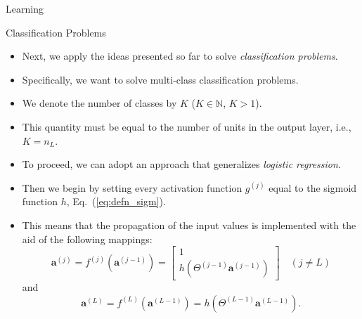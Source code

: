\documentclass[8pt,american]{beamer}
\begin{document}
\begin{frame}{Learning}

\begin{block}{Classification Problems}
\begin{itemize}
\justifying
\item Next, we apply the ideas presented so far to solve \textit{classification
  problems}.
\item Specifically, we want to solve multi-class classification problems.
\item We denote the number of classes by $K$ ($K\in\mathbb{N}$, $K>1$).
\item This quantity must be equal to the number of units in the output layer,
  i.e., $K=n_{L}$.
\item To proceed, we can adopt an approach that generalizes \textit{logistic
  regression}.
\item Then we begin by setting every activation function $g^{\left(j\right)}$
  equal to the sigmoid function $h$, Eq.~(\ref{eq:defn_sigm}).
\item This means that the propagation of the input values is implemented with
  the aid of the following mappings:
  \begin{equation}
  \mathbf{a}^{\left(j\right)}=f^{\left(j\right)}\left(\mathbf{a}^{\left(j-1\right)}\right)=\begin{bmatrix}1\\
  h\left(\Theta^{\left(j-1\right)}\mathbf{a}^{\left(j-1\right)}\right)
  \end{bmatrix}\quad\left(j\neq L\right)
  \end{equation}
  and
  \begin{equation}
  \mathbf{a}^{\left(L\right)}=f^{\left(L\right)}\left(\mathbf{a}^{\left(L-1\right)}\right)=h\left(\Theta^{\left(L-1\right)}\mathbf{a}^{\left(L-1\right)}\right).
  \end{equation}
\end{itemize}
\end{block}

\end{frame}
\end{document}
